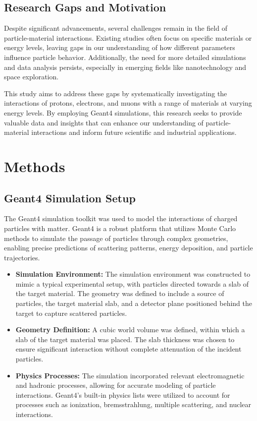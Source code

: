 \documentclass{article}
\begin{document}
\subsection{Research Gaps and Motivation}

Despite significant advancements, several challenges remain in the field of particle-material interactions. Existing studies often focus on specific materials or energy levels, leaving gaps in our understanding of how different parameters influence particle behavior. Additionally, the need for more detailed simulations and data analysis persists, especially in emerging fields like nanotechnology and space exploration.

This study aims to address these gaps by systematically investigating the interactions of protons, electrons, and muons with a range of materials at varying energy levels. By employing Geant4 simulations, this research seeks to provide valuable data and insights that can enhance our understanding of particle-material interactions and inform future scientific and industrial applications.

\section{Methods}

\subsection{Geant4 Simulation Setup}

The Geant4 simulation toolkit was used to model the interactions of charged particles with matter. Geant4 is a robust platform that utilizes Monte Carlo methods to simulate the passage of particles through complex geometries, enabling precise predictions of scattering patterns, energy deposition, and particle trajectories.

\begin{itemize}
    \item \textbf{Simulation Environment:} The simulation environment was constructed to mimic a typical experimental setup, with particles directed towards a slab of the target material. The geometry was defined to include a source of particles, the target material slab, and a detector plane positioned behind the target to capture scattered particles.

    \item \textbf{Geometry Definition:} A cubic world volume was defined, within which a slab of the target material was placed. The slab thickness was chosen to ensure significant interaction without complete attenuation of the incident particles.

    \item \textbf{Physics Processes:} The simulation incorporated relevant electromagnetic and hadronic processes, allowing for accurate modeling of particle interactions. Geant4's built-in physics lists were utilized to account for processes such as ionization, bremsstrahlung, multiple scattering, and nuclear interactions.
\end{itemize}
\end{document}
